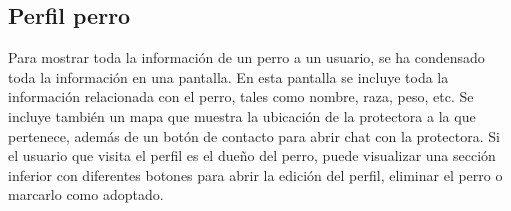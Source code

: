\documentclass[a4paper, 12pt]{article}
\begin{document}
\newpage
\subsection*{Perfil perro}

Para mostrar toda la información de un perro a un usuario, se ha condensado toda la información en una pantalla. En esta pantalla se incluye toda la información relacionada con el perro, tales como nombre, raza, peso, etc. Se incluye también un mapa que muestra la ubicación de la protectora a la que pertenece, además de un botón de contacto para abrir chat con la protectora. Si el usuario que visita el perfil es el dueño del perro, puede visualizar una sección inferior con diferentes botones para abrir la edición del perfil, eliminar el perro o marcarlo como adoptado. 
\end{document}
